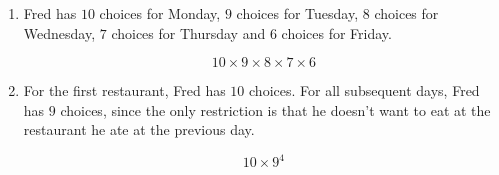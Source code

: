 \begin{enumerate}[label=(\alph*)]
\item Fred has $10$ choices for Monday, $9$ choices for Tuesday, $8$ choices 
for Wednesday, $7$ choices for Thursday and $6$ choices for Friday. 

  $$ 10 \times 9 \times 8 \times 7 \times6 $$

\item For the first restaurant, Fred has $10$ choices. For all subsequent days, 
Fred has $9$ choices, since the only restriction is that he doesn't want to eat 
at the restaurant he ate at the previous day.

  $$ 10 \times 9^{4} $$
\end{enumerate}